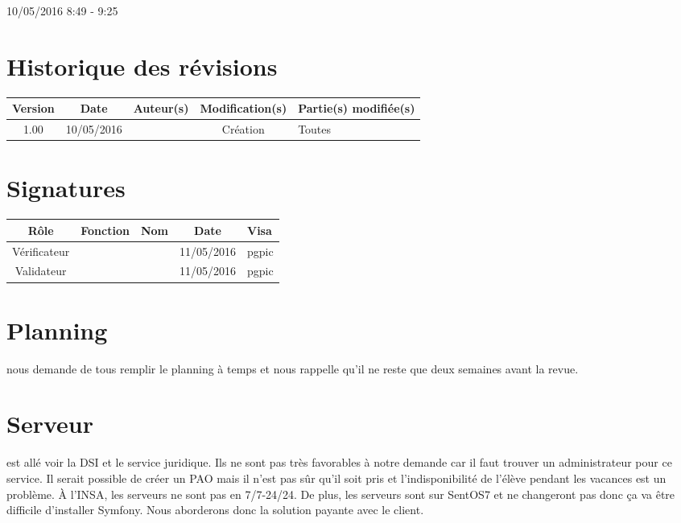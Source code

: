 \documentclass [a4paper] {article}
\begin{document}
10/05/2016			 				%
\hfill   
\hfill 	 8:49 - 9:25				%



\section*{Historique des révisions}
\begin{center}
			\begin{tabular}{| c | c | c | c | p{4cm} |}
				\hline
				\rowcolor{Gray}
				Version & Date & Auteur(s) & Modification(s) & Partie(s) modifiée(s)		 \\
				\hline
				1.00 & 10/05/2016 & \Pierre & Création & Toutes \\
		\hline		
			\end{tabular}
		\end{center}

\section*{Signatures}

		\begin{center}
			\begin{tabular}{| c | c | c | c | p{4cm} |}
				\hline
				\rowcolor{Gray}
				Rôle & Fonction & Nom & Date & Visa		 \\
				\hline
				Vérificateur & \RQA & \Kafui & 11/05/2016 & pgpic \\[30pt]
				\hline
				Validateur & \CP & \Sergi & 11/05/2016 & pgpic \\[30pt]	
				\hline
			\end{tabular}
		\end{center}


\section{Planning}
\Sergi{} nous demande de tous remplir le planning à temps et nous rappelle qu'il ne reste que deux semaines avant la revue.

\section{Serveur}
\Sergi{} est allé voir la DSI et le service juridique. Ils ne sont pas très favorables à notre demande car il faut trouver un administrateur pour ce service. Il serait possible de créer un PAO mais il n'est pas sûr qu'il soit pris et l'indisponibilité de l'élève pendant les vacances est un problème. À l'INSA, les serveurs ne sont pas en 7/7-24/24. De plus, les serveurs sont sur SentOS7 et ne changeront pas donc ça va être difficile d'installer Symfony. Nous aborderons donc la solution payante avec le client.
\end{document}
